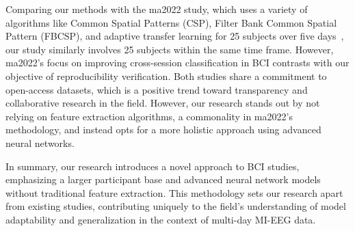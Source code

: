     Comparing our methods with the ma2022 study, which uses a variety of algorithms like Common Spatial Patterns (CSP), Filter Bank Common Spatial Pattern (FBCSP), and adaptive transfer learning for 25 subjects over five days~\cite{ma2022large}, our study similarly involves 25 subjects within the same time frame. However, ma2022's focus on improving cross-session classification in BCI contrasts with our objective of reproducibility verification. Both studies share a commitment to open-access datasets, which is a positive trend toward transparency and collaborative research in the field. However, our research stands out by not relying on feature extraction algorithms, a commonality in ma2022's methodology, and instead opts for a more holistic approach using advanced neural networks.

    In summary, our research introduces a novel approach to BCI studies, emphasizing a larger participant base and advanced neural network models without traditional feature extraction. This methodology sets our research apart from existing studies, contributing uniquely to the field's understanding of model adaptability and generalization in the context of multi-day MI-EEG data.